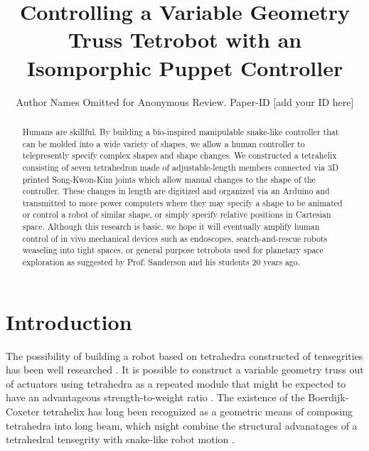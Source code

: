 \documentclass[conference]{IEEEtran}
\begin{document}
\title{Controlling a Variable Geometry Truss Tetrobot with an Isomporphic Puppet Controller}

\author{Author Names Omitted for Anonymous Review. Paper-ID [add your ID here]}



\maketitle

\begin{abstract}
  Humans are skillful.
  By building a bio-inspired manipulable snake-like controller that can be
  molded into a wide variety of shapes, we allow a human controller to telepresently
  specify complex shapes and shape changes.
  We constructed a tetrahelix consisting of seven tetrahedron made of
  adjustable-length members connected via 3D printed Song-Kwon-Kim joints which
  allow manual changes to the shape of the controller. These changes in length are
  digitized and organized via an Arduino and transmitted to more power computers
  where they may specify a shape to be animated or control a robot of similar shape,
  or simply specify relative positions in Cartesian space. Although this research is basic,
  we hope it will eventually amplify human control of in vivo mechanical devices such as
  endoscopes, search-and-rescue robots weaseling into tight spaces, or general purpose
  tetrobots used for planetary space exploration as suggested by
  Prof. Sanderson and his students 20 years ago.
\end{abstract}

\IEEEpeerreviewmaketitle


\section{Introduction}

The possibility of building a robot based on tetrahedra constructed of
tensegrities has been well researched \citet{TetrobotBook,NTRT,paul2006,chen2017soft}.
It is possible to construct a variable geometry truss out of actuators
using tetrahedra as a repeated module that might be expected to have
an advantageous strength-to-weight ratio \citet{mikulas1985sequentially,mirletz2014}.
The existence of the Boerdijk-Coxeter tetrahelix \citet{coxeter1985simplicial}
has long been recognized \citet{fuller1982synergetics,graytetrahelix} as a
geometric means of composing tetrahedra into long beam, which
might combine the structural advanatages of a tetrahedral tensegrity with
snake-like robot motion \citet{hirose1993biologically,liljebäck2012snake}.
\end{document}
